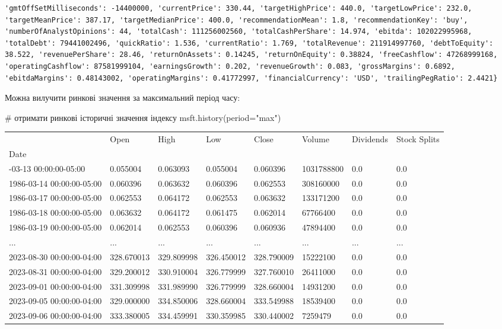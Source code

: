 \documentclass[
  letterpaper,
]{report}
\newenvironment{Shaded}{\begin{snugshade}}{\end{snugshade}}
\newcommand{\CommentTok}[1]{\textcolor[rgb]{0.37,0.37,0.37}{#1}}
\newcommand{\NormalTok}[1]{\textcolor[rgb]{0.00,0.23,0.31}{#1}}
\newcommand{\OperatorTok}[1]{\textcolor[rgb]{0.37,0.37,0.37}{#1}}
\newcommand{\StringTok}[1]{\textcolor[rgb]{0.13,0.47,0.30}{#1}}
\begin{document}
\begin{verbatim}
'gmtOffSetMilliseconds': -14400000, 'currentPrice': 330.44, 'targetHighPrice': 440.0, 'targetLowPrice': 232.0, 'targetMeanPrice': 387.17, 'targetMedianPrice': 400.0, 'recommendationMean': 1.8, 'recommendationKey': 'buy', 'numberOfAnalystOpinions': 44, 'totalCash': 111256002560, 'totalCashPerShare': 14.974, 'ebitda': 102022995968, 'totalDebt': 79441002496, 'quickRatio': 1.536, 'currentRatio': 1.769, 'totalRevenue': 211914997760, 'debtToEquity': 38.522, 'revenuePerShare': 28.46, 'returnOnAssets': 0.14245, 'returnOnEquity': 0.38824, 'freeCashflow': 47268999168, 'operatingCashflow': 87581999104, 'earningsGrowth': 0.202, 'revenueGrowth': 0.083, 'grossMargins': 0.6892, 'ebitdaMargins': 0.48143002, 'operatingMargins': 0.41772997, 'financialCurrency': 'USD', 'trailingPegRatio': 2.4421}
\end{verbatim}

Можна вилучити ринкові значення за максимальний період часу:

\begin{Shaded}
\begin{Highlighting}[]
\CommentTok{\# отримати ринкові історичні значення індексу}
\NormalTok{msft.history(period}\OperatorTok{=}\StringTok{"max"}\NormalTok{)}
\end{Highlighting}
\end{Shaded}

\begin{longtable}[]{@{}llllllll@{}}
\toprule\noalign{}
& Open & High & Low & Close & Volume & Dividends & Stock Splits \\
Date & & & & & & & \\
\midrule\noalign{}
\endhead
\bottomrule\noalign{}
\endlastfoot
1986-03-13 00:00:00-05:00 & 0.055004 & 0.063093 & 0.055004 & 0.060396 &
1031788800 & 0.0 & 0.0 \\
1986-03-14 00:00:00-05:00 & 0.060396 & 0.063632 & 0.060396 & 0.062553 &
308160000 & 0.0 & 0.0 \\
1986-03-17 00:00:00-05:00 & 0.062553 & 0.064172 & 0.062553 & 0.063632 &
133171200 & 0.0 & 0.0 \\
1986-03-18 00:00:00-05:00 & 0.063632 & 0.064172 & 0.061475 & 0.062014 &
67766400 & 0.0 & 0.0 \\
1986-03-19 00:00:00-05:00 & 0.062014 & 0.062553 & 0.060396 & 0.060936 &
47894400 & 0.0 & 0.0 \\
... & ... & ... & ... & ... & ... & ... & ... \\
2023-08-30 00:00:00-04:00 & 328.670013 & 329.809998 & 326.450012 &
328.790009 & 15222100 & 0.0 & 0.0 \\
2023-08-31 00:00:00-04:00 & 329.200012 & 330.910004 & 326.779999 &
327.760010 & 26411000 & 0.0 & 0.0 \\
2023-09-01 00:00:00-04:00 & 331.309998 & 331.989990 & 326.779999 &
328.660004 & 14931200 & 0.0 & 0.0 \\
2023-09-05 00:00:00-04:00 & 329.000000 & 334.850006 & 328.660004 &
333.549988 & 18539400 & 0.0 & 0.0 \\
2023-09-06 00:00:00-04:00 & 333.380005 & 334.459991 & 330.359985 &
330.440002 & 7259479 & 0.0 & 0.0 \\
\end{longtable}
\end{document}

